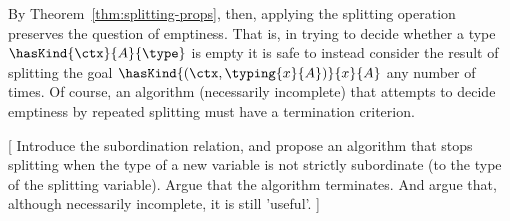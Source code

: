 By Theorem~\ref{thm:splitting-props}, then, applying the splitting operation preserves the question of emptiness.
That is, in trying to decide whether a type $\hasKind{\ctx}{A}{\type}$ is empty it is safe to instead consider the result of splitting the goal $\hasKind{(\ctx, \typing{x}{A})}{x}{A}$ any number of times.
Of course, an algorithm (necessarily incomplete) that attempts to decide emptiness by repeated splitting must have a termination criterion.

[
Introduce the subordination relation, and propose an algorithm that stops splitting when the type of a new variable is not strictly subordinate (to the type of the splitting variable).
Argue that the algorithm terminates.
And argue that, although necessarily incomplete, it is still 'useful'.
]

